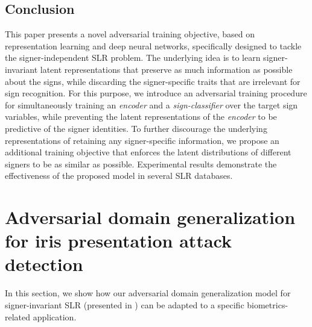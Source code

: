 \subsection{Conclusion}
\label{sec:adv_signer_inv_conclusion}

This paper presents a novel adversarial training objective, based on representation learning and deep neural networks, specifically designed to tackle the signer-independent SLR problem. The underlying idea is to learn signer-invariant latent representations that preserve as much information as possible about the signs, while discarding the signer-specific traits that are irrelevant for sign recognition. For this purpose, we introduce  an adversarial training procedure for simultaneously training an \textit{encoder} and a \textit{sign-classifier} over the target sign variables, while preventing the latent representations of the \textit{encoder} to be predictive of the signer identities. To further discourage the underlying representations of retaining any signer-specific information, we propose an additional training objective that enforces the latent distributions of different signers to be as similar as possible.
Experimental results demonstrate the effectiveness of the proposed model in several SLR databases.

\section{Adversarial domain generalization for iris presentation attack detection}
\label{sec:adv_iris_attack}
In this section, we show how our adversarial domain generalization model for signer-invariant SLR (presented in ) can be adapted to a specific biometrics-related application.

